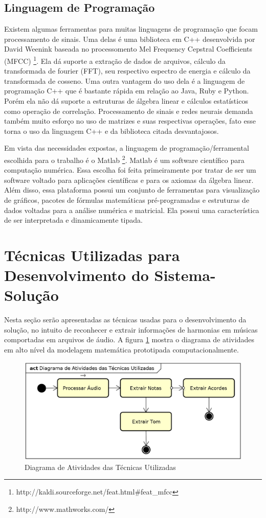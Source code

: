 \subsection{Linguagem de Programação}

Existem algumas ferramentas para muitas linguagens de programação que focam processamento de sinais. Uma delas é uma biblioteca em C++ desenvolvida por David Weenink baseada no processomento Mel Frequency Cepstral Coefficients (MFCC) \footnote{http://kaldi.sourceforge.net/feat.html\#feat\_mfcc}. Ela dá suporte a extração de dados de arquivos, cálculo da transformada de fourier (FFT), seu respectivo espectro de energia e cálculo da transformada de cosseno. Uma outra vantagem do uso dela é a linguagem de programação C++ que é bastante rápida em relação ao Java, Ruby e Python. Porém ela não dá suporte a estruturas de álgebra linear e cálculos estatísticos como operação de correlação. Processamento de sinais e redes neurais demanda também muito esforço no uso de matrizes e suas respectivas operações, fato esse torna o uso da linguagem C++ e da biblioteca citada desvantajosos.

Em vista das necessidades expostas, a linguagem de programação/ferramental escolhida para o trabalho é o Matlab \footnote{http://www.mathworks.com/}. Matlab é um software científico para computação numérica. Essa escolha foi feita primeiramente por tratar de ser um software voltado para aplicações científicas e para os axiomas da álgebra linear. Além disso, essa plataforma possui um conjunto de ferramentas para visualização de gráficos, pacotes de fórmulas matemáticas pré-programadas e estruturas de dados voltadas para a análise numérica e matricial. Ela possui uma característica de ser interpretada e dinamicamente tipada.

\section{Técnicas Utilizadas para Desenvolvimento do Sistema-Solução}

Nesta seção serão apresentadas as técnicas usadas para o desenvolvimento da solução, no intuito de reconhecer e extrair informações de harmonias em músicas comportadas em arquivos de áudio. A figura \ref{fig:dfd} mostra o diagrama de atividades em alto nível da modelagem matemática prototipada computacionalmente.

\begin{figure}[h]
	\centering
		\includegraphics[keepaspectratio=true,scale=0.35]{figuras/diagrama_atividades_1.eps}
	\caption{Diagrama de Atividades das Técnicas Utilizadas}
	\label{fig:dfd}
\end{figure}

